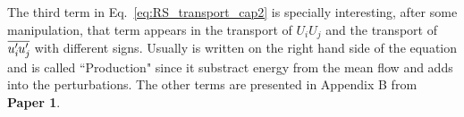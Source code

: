 The third term in Eq.~\ref{eq:RS_transport_cap2} is specially interesting, after some manipulation, that term appears in the transport of $U_iU_j$ and the transport of $\overline{u_i^{\prime}\mkern-1.2mu u_j^{\prime}\mkern-1.2mu}$ with different signs. Usually is written on the right hand side of the equation and is called ``Production" since it substract energy from the mean flow and adds into the perturbations.
The other terms are presented in Appendix B from \textbf{Paper 1}.

